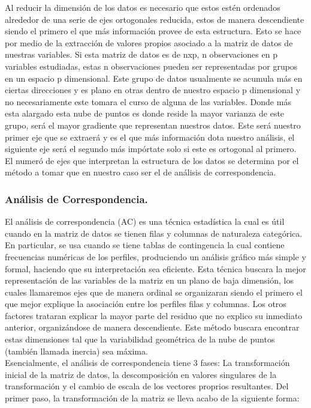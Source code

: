 Al reducir la dimensión de los datos es necesario que estos estén
ordenados alrededor de una serie de ejes ortogonales reducida, estos de
manera descendiente siendo el primero el que más información provee de
esta estructura. Esto se hace por medio de la extracción de valores
propios asociado a la matriz de datos de nuestras variables. Si esta
matriz de datos es de nxp, n observaciones en p variables estudiadas,
estas n observaciones pueden ser representadas por grupos en un espacio
p dimensional. Este grupo de datos usualmente se acumula más en ciertas
direcciones y es plano en otras dentro de nuestro espacio p dimensional
y no necesariamente este tomara el curso de alguna de las variables.
Donde más esta alargado esta nube de puntos es donde reside la mayor
varianza de este grupo, será el mayor gradiente que representan nuestros
datos. Este será nuestro primer eje que se extraerá y es el que más
información dota nuestro análisis, el siguiente eje será el segundo más
impórtate solo si este es ortogonal al primero. El numeró de ejes que
interpretan la estructura de los datos se determina por el método a
tomar que en nuestro caso ser el de análisis de correspondencia.

\hypertarget{anuxe1lisis-de-correspondencia.}{%
\subsubsection{Análisis de
Correspondencia.}\label{anuxe1lisis-de-correspondencia.}}

El análisis de correspondencia (AC) es una técnica estadística la cual
es útil cuando en la matriz de datos se tienen filas y columnas de
naturaleza categórica. En particular, se usa cuando se tiene tablas de
contingencia la cual contiene frecuencias numéricas de los perfiles,
produciendo un análisis gráfico más simple y formal, haciendo que su
interpretación sea eficiente. Esta técnica buscara la mejor
representación de las variables de la matriz en un plano de baja
dimensión, los cuales llamaremos ejes que de manera ordinal se
organizaran siendo el primero el que mejor explique la asociación entre
los perfiles filas y columnas. Los otros factores trataran explicar la
mayor parte del residuo que no explico su inmediato anterior,
organizándose de manera descendiente. Este método buscara encontrar
estas dimensiones tal que la variabilidad geométrica de la nube de
puntos (también llamada inercia) sea máxima.\\
Esencialmente, el análisis de correspondencia tiene 3 fases: La
transformación inicial de la matriz de datos, la descomposición en
valores singulares de la transformación y el cambio de escala de los
vectores proprios resultantes. Del primer paso, la transformación de la
matriz se lleva acabo de la siguiente forma:

